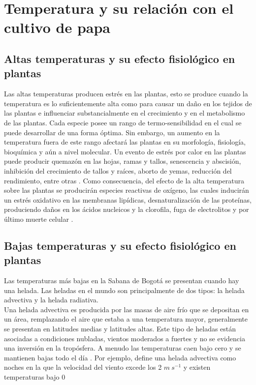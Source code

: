 \section{Temperatura y su relación con el cultivo de papa}

\subsection{Altas temperaturas y su efecto fisiológico en plantas}

Las altas temperaturas producen estrés en las plantas, esto se produce cuando la temperatura es lo suficientemente alta como para causar un daño en los tejidos de las plantas e influenciar substancialmente en el crecimiento y en el metabolismo de las plantas. Cada especie posee un rango de termo-sensibilidad en el cual se puede desarrollar de una forma óptima. Sin embargo, un aumento en la temperatura fuera de este rango afectará las plantas en su morfología, fisiología, bioquímica y aún a nivel molecular. Un evento de estrés por calor en las plantas puede producir quemazón en las hojas, ramas y tallos, senescencia y abscisión, inhibición del crecimiento de tallos y raíces, aborto de yemas, reducción del rendimiento, entre otras \citep{Pareek1997}. Como consecuencia, del efecto de la alta temperatura sobre las plantas se producirán especies reactivas de oxígeno, las cuales inducirán un estrés oxidativo en las membranas lipídicas, desnaturalización de las proteínas, produciendo daños en los ácidos nucleicos y la clorofila, fuga de electrolitos y por último muerte celular \citep{Khan2015}.

\subsection{Bajas temperaturas y su efecto fisiológico en plantas}

Las temperaturas más bajas en la Sabana de Bogotá se presentan cuando hay una helada. Las heladas en el mundo son principalmente de dos tipos: la helada advectiva y la helada radiativa.\\

Una helada advectiva es producida por las masas de aire frío que se depositan en un área, remplazando el aire que estaba a una temperatura mayor, generalmente se presentan en latitudes medias y latitudes altas. Este tipo de  heladas están asociadas a condiciones nubladas, vientos moderados a fuertes y no se evidencia una inversión en la tropósfera. A menudo las temperaturas caen bajo cero y se mantienen bajas todo el día \citep{Prabha2008a, IDEAM2012a}. Por ejemplo, \citet{Prabha2008a} define una helada advectiva como noches en la que la velocidad del viento excede los 2 $m\ s^{-1}$ y existen temperaturas bajo 0\celc \.\\

